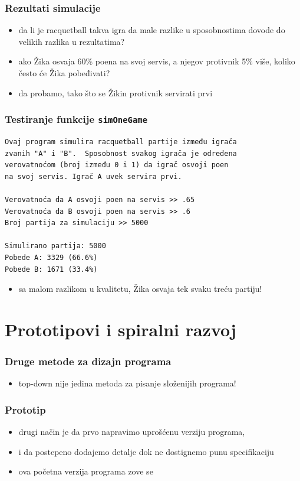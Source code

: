 \documentclass[utf8,compress]{beamer}
\begin{document}
\begin{frame}
  \frametitle{Rezultati simulacije}
\begin{itemize}
  \item da li je racquetball takva igra da male razlike u sposobnostima dovode do velikih razlika u rezultatima?
  \item ako Žika osvaja 60\% poena na svoj servis, a njegov protivnik 5\% više, koliko često će Žika pobeđivati?
  \item da probamo, tako što se Žikin protivnik servirati prvi
\end{itemize}
\end{frame}

\begin{frame}[fragile,shrink=5]
  \frametitle{Testiranje funkcije \texttt{simOneGame}}
\begin{verbatim}
Ovaj program simulira racquetball partije između igrača
zvanih "A" i "B".  Sposobnost svakog igrača je određena
verovatnoćom (broj između 0 i 1) da igrač osvoji poen
na svoj servis. Igrač A uvek servira prvi.

Verovatnoća da A osvoji poen na servis >> .65
Verovatnoća da B osvoji poen na servis >> .6
Broj partija za simulaciju >> 5000

Simulirano partija: 5000
Pobede A: 3329 (66.6%)
Pobede B: 1671 (33.4%)
\end{verbatim}
\begin{itemize}
  \item sa malom razlikom u kvalitetu, Žika osvaja tek svaku treću partiju!
\end{itemize}
\end{frame}

\section[Prototipovi]{Prototipovi i spiralni razvoj}

\begin{frame}
  \frametitle{Druge metode za dizajn programa}
\begin{itemize}
  \item top-down nije jedina metoda za pisanje složenijih programa!
\end{itemize}
\end{frame}

\begin{frame}
  \frametitle{Prototip}
\begin{itemize}
  \item drugi način je da prvo napravimo uprošćenu verziju programa, 
  \item i da postepeno dodajemo detalje dok ne dostignemo punu specifikaciju
  \item ova početna verzija programa zove se 
\end{itemize}
\end{frame}
\end{document}
